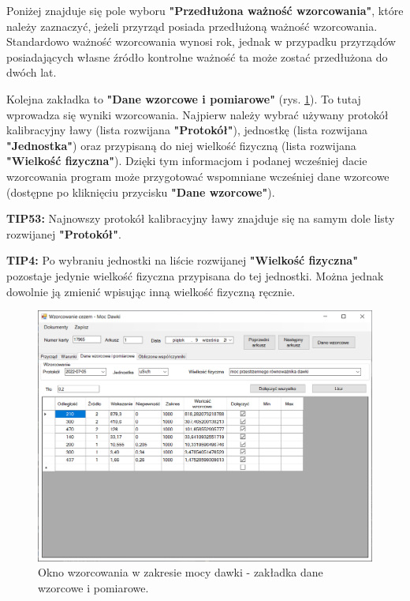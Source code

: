 Poniżej znajduje się pole wyboru \textbf{"Przedłużona ważność wzorcowania"}, które należy zaznaczyć, jeżeli przyrząd posiada przedłużoną ważność wzorcowania. Standardowo ważność wzorcowania wynosi rok, jednak w przypadku przyrządów posiadających własne źródło kontrolne ważność ta może zostać przedłużona do dwóch lat.

Kolejna zakładka to \textbf{"Dane wzorcowe i pomiarowe"} (rys. \ref{mocDane}). To tutaj wprowadza się wyniki wzorcowania. Najpierw należy wybrać używany protokół kalibracyjny ławy (lista rozwijana \textbf{"Protokół"}), jednostkę (lista rozwijana \textbf{"Jednostka"}) oraz przypisaną do niej wielkość fizyczną (lista rozwijana \textbf{"Wielkość fizyczna"}). Dzięki tym informacjom i podanej wcześniej dacie wzorcowania program może przygotować wspomniane wcześniej dane wzorcowe (dostępne po kliknięciu przycisku \textbf{"Dane wzorcowe"}).

\textbf{TIP53:} Najnowszy protokół kalibracyjny ławy znajduje się na samym dole listy rozwijanej \textbf{"Protokół"}.

\textbf{TIP4:} Po wybraniu jednostki na liście rozwijanej \textbf{"Wielkość fizyczna"} pozostaje jedynie wielkość fizyczna przypisana do tej jednostki. Można jednak dowolnie ją zmienić wpisując inną wielkość fizyczną ręcznie.

\begin{figure}[htb]
	\centering
	\includegraphics[width=\columnwidth]{obrazki/Wzorcowanie/moc_dawki/dane.png}
	\caption{Okno wzorcowania w zakresie mocy dawki - zakładka dane wzorcowe i pomiarowe.}
	\label{mocDane}
\end{figure}

